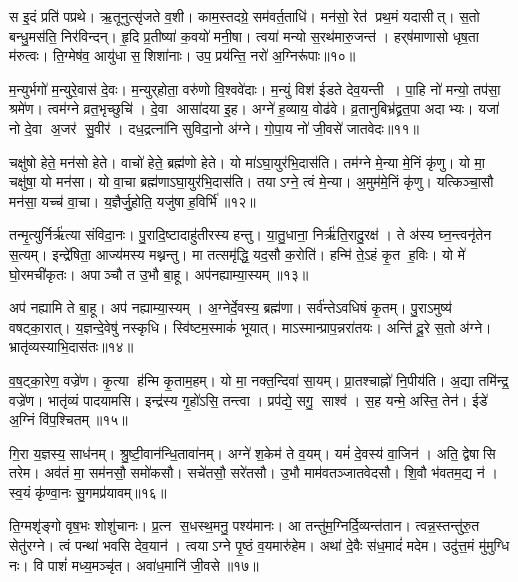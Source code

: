 स इ॒दं प्रति॑ पप्रथे।
ऋ॒तूनुत्सृ॑जते व॒शी।
काम॒स्तदग्रे॒ सम॑वर्त॒ताधि॑।
मन॑सो॒ रेत॑ प्रथ॒मं यदासीत्।
स॒तो बन्धु॒मस॑ति॒ निर॑विन्दन्।
हृ॒दि प्र॒तीष्या॑ क॒वयो॑ मनी॒षा।
त्वया॑ मन्यो स॒रथ॑मारु॒जन्त॑।
हर्‌ष॑माणासो धृष॒ता म॑रुत्वः।
ति॒ग्मेष॑व॒ आयु॑धा स॒शिशा॑नाः।
उप॒ प्रय॑न्ति॒ नरो॑ अ॒ग्निरू॑पाः॥१०॥

म॒न्युर्भगो॑ म॒न्युरे॒वास॑ दे॒वः।
म॒न्युर्‌होता॒ वरु॑णो वि॒श्ववे॑दाः।
म॒न्युं विश॑ ईडते देव॒यन्ती।
पा॒हि नो॑ मन्यो॒ तप॑सा॒ श्रमे॑ण।
त्वम॑ग्ने व्रत॒भृच्छुचि॑।
दे॒वा आसा॑दया इ॒ह।
अग्ने॑ ह॒व्याय॒ वोढ॑वे।
व्र॒तानुबिभ्र॑द्व्रत॒पा अदाभ्यः।
यजा॑ नो दे॒वा अ॒जर॑ सु॒वीर॑।
दध॒द्रत्ना॑नि सुविदा॒नो अ॑ग्ने।
गो॒पा॒य नो॑ जी॒वसे॑ जातवेदः॥११॥\anuvakamend[जिघासत्य॒मित्राञ्जघ॒न्वानी॑डते॒ सर्वा॒ अह॑सो वातो हृ॒दे रा॑जत्य॒ग्निरू॑पाः सुविदा॒नो अ॑ग्न॒ एकं च]

चक्षु॑षो हेते॒ मन॑सो हेते।
वाचो॑ हेते॒ ब्रह्म॑णो हेते।
यो मा॑ऽघा॒युर॑भि॒दास॑ति।
तम॑ग्ने मे॒न्या मे॒निं कृ॑णु।
यो मा॒ चक्षु॑षा॒ यो मन॑सा।
यो वा॒चा ब्रह्म॑णाऽघा॒युर॑भि॒दास॑ति।
तयाऽग्ने॒ त्वं मे॒न्या।
अ॒मुम॑मे॒निं कृ॑णु।
यत्किञ्चा॒सौ मन॑सा॒ यच्च॑ वा॒चा।
य॒ज्ञैर्जु॒होति॒ यजु॑षा ह॒विर्भि॑॥१२॥

तन्मृ॒त्युर्निर्\mbox{}ऋ॑त्या संविदा॒नः।
पु॒रादि॒ष्टादाहु॑तीरस्य हन्तु।
या॒तु॒धाना॒ निर्\mbox{}ऋ॑ति॒रादु॒रक्ष॑।
ते अ॑स्य घ्न॒न्त्वनृ॑तेन स॒त्यम्।
इन्द्रे॑षिता॒ आज्य॑मस्य मथ्नन्तु।
मा तत्समृ॑द्धि॒ यद॒सौ क॒रोति॑।
हन्मि॑ ते॒ऽहं कृ॒त ह॒विः।
यो मे॑ घो॒रमची॑कृतः।
अपाञ्चौ त उ॒भौ बा॒हू।
अप॑नह्याम्या॒स्यम्॥१३॥

अप॑ नह्यामि ते बा॒हू।
अप॑ नह्याम्या॒स्यम्।
अ॒ग्नेर्दे॒वस्य॒ ब्रह्म॑णा।
सर्व॑न्तेऽवधिषं कृ॒तम्।
पु॒राऽमुष्य॑ वषट्का॒रात्।
य॒ज्ञन्दे॒वेषु॑ नस्कृधि।
स्वि॑ष्टम॒स्माकं॑ भूयात्।
माऽस्मान्प्राप॒न्नरा॑तयः।
अन्ति॑ दू॒रे स॒तो अ॑ग्ने।
भ्रातृ॑व्यस्याभि॒दास॑तः॥१४॥

व॒ष॒ट्का॒रेण॒ वज्रे॑ण।
कृ॒त्या ह॑न्मि कृ॒ताम॒हम्।
यो मा॒ नक्त॒न्दिवा॑ सा॒यम्।
प्रा॒तश्चाह्नो॑ नि॒पीय॑ति।
अ॒द्या तमि॑न्द्र॒ वज्रे॑ण।
भातृ॑व्यं पादयामसि।
इन्द्र॑स्य गृ॒हो॑ऽसि॒ तन्त्वा।
प्रप॑द्ये॒ सगु॒ साश्व॑।
स॒ह यन्मे॒ अस्ति॒ तेन॑।
ईडे॑ अ॒ग्निं वि॑प॒श्चितम्॥१५॥

गि॒रा य॒ज्ञस्य॒ साध॑नम्।
श्रु॒ष्टी॒वान॑न्धि॒तावा॑नम्।
अग्ने॑ श॒केम॑ ते व॒यम्।
यमं॑ दे॒वस्य॑ वा॒जिन॑।
अति॒ द्वेषासि तरेम।
अव॑तं मा॒ सम॑नसौ॒ समो॑कसौ।
सचे॑तसौ॒ सरे॑तसौ।
उ॒भौ माम॑वतञ्जातवेदसौ।
शि॒वौ भ॑वतम॒द्य न॑।
स्व॒यं कृ॑ण्वा॒नः सु॒गमप्र॑यावम्॥१६॥

ति॒ग्मशृ॑ङ्गो वृष॒भः शोशु॑चानः।
प्र॒त्न स॒धस्थ॒मनु॒ पश्य॑मानः।
आ तन्तु॑म॒ग्निर्दि॒व्यन्त॑तान।
त्वन्न॒स्तन्तु॑रु॒त सेतु॑रग्ने।
त्वं पन्था॑ भवसि देव॒यान॑।
त्वयाऽग्ने पृ॒ष्ठं व॒यमारु॑हेम।
अथा॑ दे॒वैः स॑ध॒मादं॑ मदेम।
उदु॑त्त॒मं मु॑मुग्धि नः।
वि पाशं॑ मध्य॒मञ्चृ॑त।
अवा॑ध॒मानि॑ जी॒वसे॥१७॥

